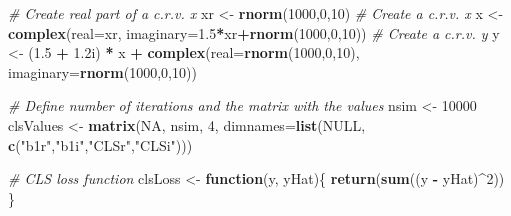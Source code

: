 \documentclass[
]{book}
\newenvironment{Shaded}{\begin{snugshade}}{\end{snugshade}}
\newcommand{\CommentTok}[1]{\textcolor[rgb]{0.56,0.35,0.01}{\textit{#1}}}
\newcommand{\ControlFlowTok}[1]{\textcolor[rgb]{0.13,0.29,0.53}{\textbf{#1}}}
\newcommand{\DataTypeTok}[1]{\textcolor[rgb]{0.13,0.29,0.53}{#1}}
\newcommand{\DecValTok}[1]{\textcolor[rgb]{0.00,0.00,0.81}{#1}}
\newcommand{\FloatTok}[1]{\textcolor[rgb]{0.00,0.00,0.81}{#1}}
\newcommand{\KeywordTok}[1]{\textcolor[rgb]{0.13,0.29,0.53}{\textbf{#1}}}
\newcommand{\NormalTok}[1]{#1}
\newcommand{\OperatorTok}[1]{\textcolor[rgb]{0.81,0.36,0.00}{\textbf{#1}}}
\newcommand{\OtherTok}[1]{\textcolor[rgb]{0.56,0.35,0.01}{#1}}
\newcommand{\StringTok}[1]{\textcolor[rgb]{0.31,0.60,0.02}{#1}}
\begin{document}
\begin{Shaded}
\begin{Highlighting}[]
\CommentTok{\# Create real part of a c.r.v. x}
\NormalTok{xr \textless{}{-}}\StringTok{ }\KeywordTok{rnorm}\NormalTok{(}\DecValTok{1000}\NormalTok{,}\DecValTok{0}\NormalTok{,}\DecValTok{10}\NormalTok{)}
\CommentTok{\# Create a c.r.v. x}
\NormalTok{x \textless{}{-}}\StringTok{ }\KeywordTok{complex}\NormalTok{(}\DataTypeTok{real=}\NormalTok{xr, }\DataTypeTok{imaginary=}\FloatTok{1.5}\OperatorTok{*}\NormalTok{xr}\OperatorTok{+}\KeywordTok{rnorm}\NormalTok{(}\DecValTok{1000}\NormalTok{,}\DecValTok{0}\NormalTok{,}\DecValTok{10}\NormalTok{))}
\CommentTok{\# Create a c.r.v. y}
\NormalTok{y \textless{}{-}}\StringTok{ }\NormalTok{(}\FloatTok{1.5} \OperatorTok{+}\StringTok{ }\FloatTok{1.2}\NormalTok{i) }\OperatorTok{*}\StringTok{ }\NormalTok{x }\OperatorTok{+}
\StringTok{    }\KeywordTok{complex}\NormalTok{(}\DataTypeTok{real=}\KeywordTok{rnorm}\NormalTok{(}\DecValTok{1000}\NormalTok{,}\DecValTok{0}\NormalTok{,}\DecValTok{10}\NormalTok{), }\DataTypeTok{imaginary=}\KeywordTok{rnorm}\NormalTok{(}\DecValTok{1000}\NormalTok{,}\DecValTok{0}\NormalTok{,}\DecValTok{10}\NormalTok{))}

\CommentTok{\# Define number of iterations and the matrix with the values}
\NormalTok{nsim \textless{}{-}}\StringTok{ }\DecValTok{10000}
\NormalTok{clsValues \textless{}{-}}\StringTok{ }\KeywordTok{matrix}\NormalTok{(}\OtherTok{NA}\NormalTok{, nsim, }\DecValTok{4}\NormalTok{,}
                    \DataTypeTok{dimnames=}\KeywordTok{list}\NormalTok{(}\OtherTok{NULL}\NormalTok{,}
                                  \KeywordTok{c}\NormalTok{(}\StringTok{"b1r"}\NormalTok{,}\StringTok{"b1i"}\NormalTok{,}\StringTok{"CLSr"}\NormalTok{,}\StringTok{"CLSi"}\NormalTok{)))}

\CommentTok{\# CLS loss function}
\NormalTok{clsLoss \textless{}{-}}\StringTok{ }\ControlFlowTok{function}\NormalTok{(y, yHat)\{}
    \KeywordTok{return}\NormalTok{(}\KeywordTok{sum}\NormalTok{((y }\OperatorTok{{-}}\StringTok{ }\NormalTok{yHat)}\OperatorTok{\^{}}\DecValTok{2}\NormalTok{))}
\NormalTok{\}}


\end{Highlighting}
\end{Shaded}
\end{document}
